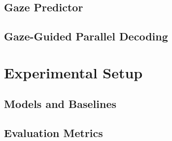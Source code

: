 \documentclass[11pt]{article}
\begin{document}

\subsection{Gaze Predictor}
\label{sec:method:gaze}


\subsection{Gaze-Guided Parallel Decoding}
\label{sec:method:guidance}


\section{Experimental Setup}
\label{sec:experiments}


\subsection{Models and Baselines}
\label{sec:experiments:models}


\subsection{Evaluation Metrics}
\label{sec:experiments:metrics}

\end{document}

